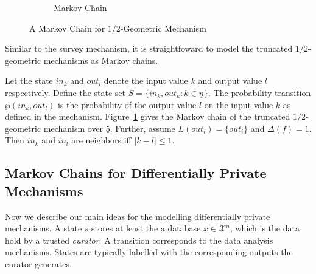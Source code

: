 \begin{figure}
\begin{subfigure}{.50\columnwidth}
{
    }
    \caption{Markov Chain}
    \label{figure:geometric-mechanism-markov-chain}
  \end{subfigure}

  \caption{A Markov Chain for $1/2$-Geometric Mechanism}
  \label{figure:geometric-mechanism}
\end{figure}

Similar to the survey mechanism, it is
straightfoward to model the truncated $1/2$-geometric
mechanisms as Markov chains. 

\begin{example}  
Let the state $in_k$ and $out_l$
denote the input value $k$ and output value $l$ respectively. Define
the state set $S = \{ in_k, out_k : k \in \underline{n} \}$.
The probability transition $\wp (in_k, out_l)$ is the probability of the
output value $l$ on the input value $k$ as defined in the
mechanism. Figure~\ref{figure:geometric-mechanism-markov-chain} gives
the Markov chain of the truncated
$1/2$-geometric mechanism over $\underline{5}$. Further, assume
$L(out_i) = \{ out_i \}$ and $\Delta (f) = 1$. Then $in_k$ and $in_l$ are
neighbors iff $| k - l | \leq 1$.
\end{example}

\subsection{Markov Chains for Differentially Private Mechanisms}
Now we describe our main ideas for the modelling differentially private mechanisms. 
A state $s$ stores at least the a database $x\in \mathcal{X}^n$, which is the data hold by a trusted \emph{curator}. A transition corresponds to the data analysis mechanisms.
States are typically labelled with the corresponding outputs
the curator generates. 

